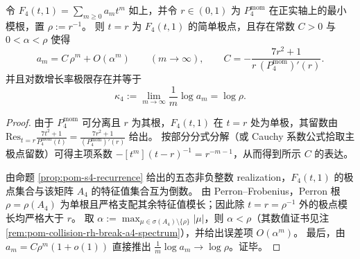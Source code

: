 \begin{theorem}[四阶碰撞矩的主极点常数与对数增长率]\label{thm:xi-zm4-moment-kernel-residue-asymptotics}
令
\(
F_4(t,1)=\sum_{m\ge 0}a_m t^m
\)
如上，并令 \(r\in(0,1)\) 为 \(P^{\mathrm{mom}}_{4}\) 在正实轴上的最小模根，置 \(\rho:=r^{-1}\)。
则 \(t=r\) 为 \(F_4(t,1)\) 的简单极点，且存在常数 \(C>0\) 与 \(0<\alpha<\rho\) 使得
\[
a_m=C\,\rho^{m}+O(\alpha^{m})\qquad(m\to\infty),
\qquad
C=-\frac{7r^{2}+1}{r\,(P^{\mathrm{mom}}_{4})'(r)}.
\]
并且对数增长率极限存在并等于
\[
\kappa_{4}:=\lim_{m\to\infty}\frac1m\log a_m=\log\rho.
\]
\end{theorem}
\begin{proof}
由于 \(P^{\mathrm{mom}}_{4}\) 可分离且 \(r\) 为其根，\(F_4(t,1)\) 在 \(t=r\) 处为单极，其留数由
\(
\mathrm{Res}_{t=r}\frac{7t^2+1}{P_4^{\mathrm{mom}}(t)}=\frac{7r^2+1}{(P_4^{\mathrm{mom}})'(r)}
\)
给出。
按部分分式分解（或 Cauchy 系数公式拾取主极点留数）可得主项系数
\(
-[t^m](t-r)^{-1}=r^{-m-1}
\)，从而得到所示 \(C\) 的表达。
\par
由命题 \ref{prop:pom-s4-recurrence} 给出的五态非负整数 realization，\(F_4(t,1)\) 的极点集合与该矩阵 \(A_4\) 的特征值集合互为倒数。
由 Perron--Frobenius，Perron 根 \(\rho=\rho(A_4)\) 为单根且严格支配其余特征值模长；因此除 \(t=r=\rho^{-1}\) 外的极点模长均严格大于 \(r\)。
取 \(\alpha:=\max_{\mu\in\sigma(A_4)\setminus\{\rho\}}|\mu|\)，则 \(\alpha<\rho\)（其数值证书见注 \ref{rem:pom-collision-rh-break-a4-spectrum}），并给出误差项 \(O(\alpha^m)\)。
最后，由 \(a_m=C\rho^m(1+o(1))\) 直接推出 \(\frac1m\log a_m\to \log\rho\)。证毕。
\end{proof}
